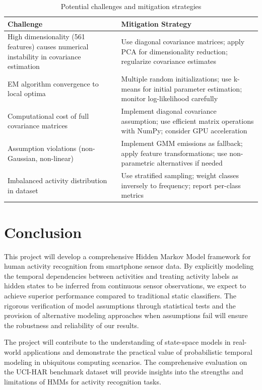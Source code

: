\documentclass[11pt,a4paper]{article}
\begin{document}
\begin{table}[h]
\centering
\small
\begin{tabular}{@{}p{}p{}@{}}
\toprule
\textbf{Challenge} & \textbf{Mitigation Strategy} \\ \midrule
High dimensionality (561 features) causes numerical instability in covariance estimation & 
Use diagonal covariance matrices; apply PCA for dimensionality reduction; regularize covariance estimates \\[1em]

EM algorithm convergence to local optima & 
Multiple random initializations; use k-means for initial parameter estimation; monitor log-likelihood carefully \\[1em]

Computational cost of full covariance matrices & 
Implement diagonal covariance assumption; use efficient matrix operations with NumPy; consider GPU acceleration \\[1em]

Assumption violations (non-Gaussian, non-linear) & 
Implement GMM emissions as fallback; apply feature transformations; use non-parametric alternatives if needed \\[1em]

Imbalanced activity distribution in dataset & 
Use stratified sampling; weight classes inversely to frequency; report per-class metrics \\
\bottomrule
\end{tabular}
\caption{Potential challenges and mitigation strategies}
\end{table}

\section{Conclusion}

This project will develop a comprehensive Hidden Markov Model framework for human activity recognition from smartphone sensor data. By explicitly modeling the temporal dependencies between activities and treating activity labels as hidden states to be inferred from continuous sensor observations, we expect to achieve superior performance compared to traditional static classifiers. The rigorous verification of model assumptions through statistical tests and the provision of alternative modeling approaches when assumptions fail will ensure the robustness and reliability of our results.

The project will contribute to the understanding of state-space models in real-world applications and demonstrate the practical value of probabilistic temporal modeling in ubiquitous computing scenarios. The comprehensive evaluation on the UCI-HAR benchmark dataset will provide insights into the strengths and limitations of HMMs for activity recognition tasks.
\end{document}
